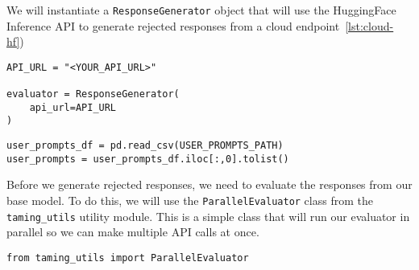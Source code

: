 We will instantiate a \texttt{ResponseGenerator} object that will use the HuggingFace Inference API to generate rejected responses from a cloud endpoint~\ref{lst:cloud-hf})~

\begin{verbatim}
API_URL = "<YOUR_API_URL>"

evaluator = ResponseGenerator(
    api_url=API_URL
)  
\end{verbatim}

\begin{verbatim}
user_prompts_df = pd.read_csv(USER_PROMPTS_PATH)
user_prompts = user_prompts_df.iloc[:,0].tolist()
\end{verbatim}

Before we generate rejected responses, we need to evaluate the responses from our base model. To do this, we will use the \texttt{ParallelEvaluator} class from the \texttt{taming\_utils} utility module. This is a simple class that will run our evaluator in parallel so we can make multiple API calls at once.

\begin{verbatim}
from taming_utils import ParallelEvaluator
\end{verbatim}

